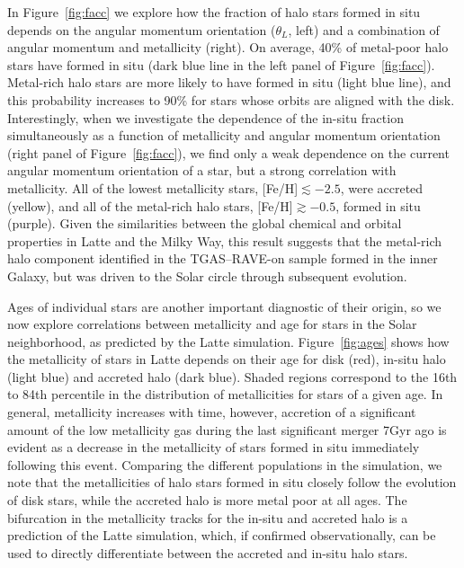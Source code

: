 \documentclass[apj, twocolappendix, numberedappendix, appendixfloats]{emulateapj}
\begin{document}
In Figure~\ref{fig:facc} we explore how the fraction of halo stars formed in situ depends on the angular momentum orientation ($\theta_L$, left) and a combination of angular momentum and metallicity (right).
On average, 40\% of metal-poor halo stars have formed in situ (dark blue line in the left panel of Figure~\ref{fig:facc}).
Metal-rich halo stars are more likely to have formed in situ (light blue line), and this probability increases to 90\% for stars whose orbits are aligned with the disk.
Interestingly, when we investigate the dependence of the in-situ fraction simultaneously as a function of metallicity and angular momentum orientation (right panel of Figure~\ref{fig:facc}), we find only a weak dependence on the current angular momentum orientation of a star, but a strong correlation with metallicity.
All of the lowest metallicity stars, [Fe/H]$\lesssim-2.5$, were accreted (yellow), and all of the metal-rich halo stars, [Fe/H]$\gtrsim-0.5$, formed in situ (purple).
Given the similarities between the global chemical and orbital properties in Latte and the Milky Way, this result suggests that the metal-rich halo component identified in the TGAS--RAVE-on sample formed in the inner Galaxy, but was driven to the Solar circle through subsequent evolution.

Ages of individual stars are another important diagnostic of their origin, so we now explore correlations between metallicity and age for stars in the Solar neighborhood, as predicted by the Latte simulation.
Figure~\ref{fig:ages} shows how the metallicity of stars in Latte depends on their age for disk (red), in-situ halo (light blue) and accreted halo (dark blue).
Shaded regions correspond to the 16th to 84th percentile in the distribution of metallicities for stars of a given age.
In general, metallicity increases with time, however, accretion of a significant amount of the low metallicity gas during the last significant merger 7\;Gyr ago is evident as a decrease in the metallicity of stars formed in situ immediately following this event.
Comparing the different populations in the simulation, we note that the metallicities of halo stars formed in situ closely follow the evolution of disk stars, while the accreted halo is more metal poor at all ages.
The bifurcation in the metallicity tracks for the in-situ and accreted halo is a prediction of the Latte simulation, which, if confirmed observationally, can be used to directly differentiate between the accreted and in-situ halo stars.
\end{document}
